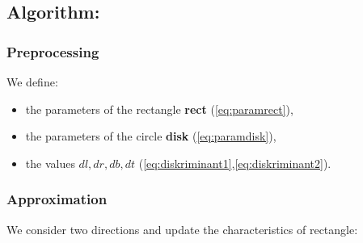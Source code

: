\documentclass{report}
\begin{document}
\subsection*{Algorithm:}

\subsubsection*{Preprocessing}

We define:

\begin{itemize}
	
	\item the parameters of the rectangle {\bfseries rect} (\ref{eq:paramrect}),
	
	\item the parameters of the circle {\bfseries disk} (\ref{eq:paramdisk}),
	
	\item the values $dl, dr, db, dt$ (\ref{eq:diskriminant1},\ref{eq:diskriminant2}).
	
\end{itemize}

\subsubsection*{Approximation}

We consider two directions and update the characteristics of rectangle:
\end{document}
